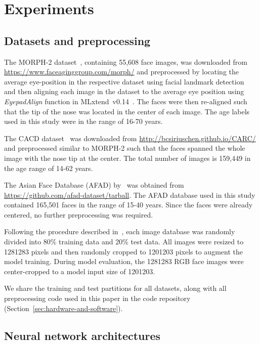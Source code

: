 \documentclass[times,twocolumn,final,authoryear]{elsarticle}
\begin{document}
\section{Experiments}
\label{sec:experiments}




\subsection{Datasets and preprocessing}
\label{sec:datasets}

The MORPH-2 dataset~\citep{ricanek2006morph}, containing 55,608 face images, was downloaded from \url{https://www.faceaginggroup.com/morph/} and preprocessed by locating the average eye-position in the respective dataset using facial landmark detection~\citep{sagonas2016300} and then aligning each image in the dataset to the average eye position using \textit{EyepadAlign} function in MLxtend~v0.14~\citep{raschka2018mlxtend}. The faces were then re-aligned such that the tip of the nose was located in the center of each image. The age labels used in this study were in the range of 16-70 years. 

The CACD dataset~\citep{chen2014cross} was downloaded from \url{http://bcsiriuschen.github.io/CARC/} and preprocessed similar to MORPH-2 such that the faces spanned the whole image with the nose tip at the center. The total number of images is 159,449 in the age range of 14-62 years. 

The Asian Face Database (AFAD) by~\cite{niu2016ordinal} was obtained from \url{https://github.com/afad-dataset/tarball}. The AFAD database used in this study contained 165,501 faces in the range of 15-40 years. Since the faces were already centered,  no further preprocessing was required.

Following the procedure described in~\cite{niu2016ordinal}, each image database was randomly divided into 80\% training data and 20\% test data. All images were resized to 1281283 pixels and then randomly cropped to 1201203 pixels to augment the model training. During model evaluation, the 1281283 RGB face images were center-cropped to a model input size of 1201203. 

We share the training and test partitions for all datasets, along with all preprocessing code used in this paper in the code repository (Section~\ref{sec:hardware-and-software}).




\subsection{Neural network architectures}
\label{sec:architecture}
\end{document}
